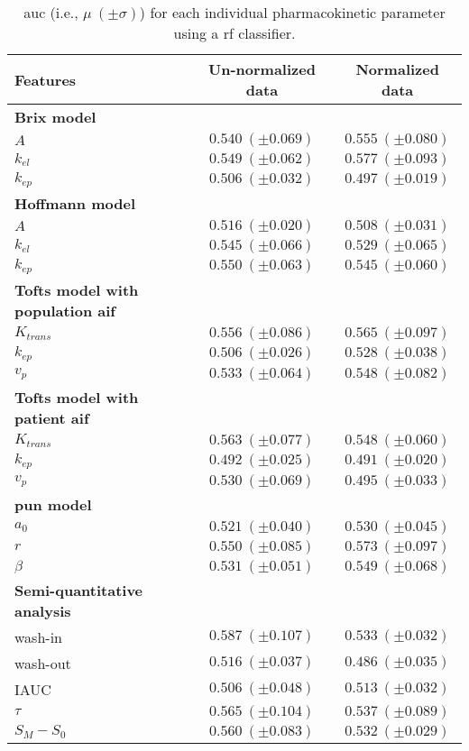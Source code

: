 \begin{table}
  \caption{\acs*{auc} (i.e., $\mu \ (\pm \sigma)$) for each individual pharmacokinetic parameter using a \acs*{rf} classifier.}
  \centering
  \scriptsize
  \begin{tabular}{lcc}
    \toprule
    \textbf{Features} & Un-normalized data & Normalized data \\
    \midrule
    \textbf{Brix model} & & \\
    \quad $A$         & $0.540\ (\pm 0.069)$ & $0.555\ (\pm 0.080)$ \\
    \quad $k_{el}$    & $0.549\ (\pm 0.062)$ & $0.577\ (\pm 0.093)$ \\
    \quad $k_{ep}$    & $0.506\ (\pm 0.032)$ & $0.497\ (\pm 0.019)$ \\
    \textbf{Hoffmann model} & & \\
    \quad $A$         & $0.516\ (\pm 0.020)$ & $0.508\ (\pm 0.031)$ \\
    \quad $k_{el}$    & $0.545\ (\pm 0.066)$ & $0.529\ (\pm 0.065)$ \\
    \quad $k_{ep}$    & $0.550\ (\pm 0.063)$ & $0.545\ (\pm 0.060)$ \\
    \textbf{Tofts model with population \acs*{aif}} & & \\
    \quad $K_{trans}$ & $0.556\ (\pm 0.086)$ & $0.565\ (\pm 0.097)$ \\
    \quad $k_{ep}$    & $0.506\ (\pm 0.026)$ & $0.528\ (\pm 0.038)$ \\
    \quad $v_{p}$     & $0.533\ (\pm 0.064)$ & $0.548\ (\pm 0.082)$ \\
    \textbf{Tofts model with patient \acs*{aif}} & & \\
    \quad $K_{trans}$ & $0.563\ (\pm 0.077)$ & $0.548\ (\pm 0.060)$ \\
    \quad $k_{ep}$    & $0.492\ (\pm 0.025)$ & $0.491\ (\pm 0.020)$ \\
    \quad $v_{p}$     & $0.530\ (\pm 0.069)$ & $0.495\ (\pm 0.033)$ \\
    \textbf{\acs*{pun} model} & & \\
    \quad $a_0$       & $0.521\ (\pm 0.040)$ & $0.530\ (\pm 0.045)$ \\
    \quad $r$         & $0.550\ (\pm 0.085)$ & $0.573\ (\pm 0.097)$ \\
    \quad $\beta$     & $0.531\ (\pm 0.051)$ & $0.549\ (\pm 0.068)$ \\
    \textbf{Semi-quantitative analysis} & & \\
    \quad wash-in     & $0.587\ (\pm 0.107)$ & $0.533\ (\pm 0.032)$ \\
    \quad wash-out    & $0.516\ (\pm 0.037)$ & $0.486\ (\pm 0.035)$ \\
    \quad IAUC        & $0.506\ (\pm 0.048)$ & $0.513\ (\pm 0.032)$ \\
    \quad $\tau$      & $0.565\ (\pm 0.104)$ & $0.537\ (\pm 0.089)$ \\
    \quad $S_M - S_0$ & $0.560\ (\pm 0.083)$ & $0.532\ (\pm 0.029)$ \\
    \bottomrule
  \end{tabular}
  \label{tab:resfeats}
\end{table}

